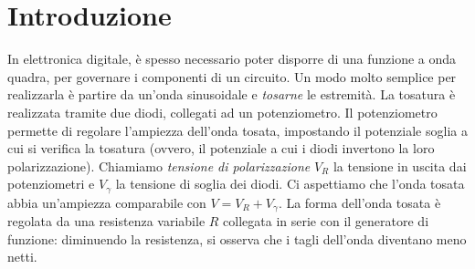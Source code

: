 \section{Introduzione}\label{sec:scopo}
In elettronica digitale, è spesso necessario poter disporre di una funzione
a onda quadra, per governare i componenti di un circuito.
Un modo molto semplice per realizzarla è partire
da un'onda sinusoidale e \emph{tosarne} le estremità.
La tosatura è realizzata tramite due diodi, collegati ad un potenziometro.
Il potenziometro permette di regolare l'ampiezza dell'onda tosata, impostando il
potenziale soglia a cui si verifica la tosatura (ovvero, il potenziale a cui i
diodi invertono la loro polarizzazione).
Chiamiamo \emph{tensione di polarizzazione} $V_{R}$ la tensione in uscita dai potenziometri
e $V_{\gamma}$ la tensione di soglia dei diodi.
Ci aspettiamo che l'onda tosata abbia un'ampiezza comparabile con $V = V_R + V_\gamma$.
La forma dell'onda tosata è regolata da una resistenza variabile $R$ collegata in serie con il
generatore di funzione: diminuendo la resistenza, si osserva che i tagli dell'onda
diventano meno netti.
